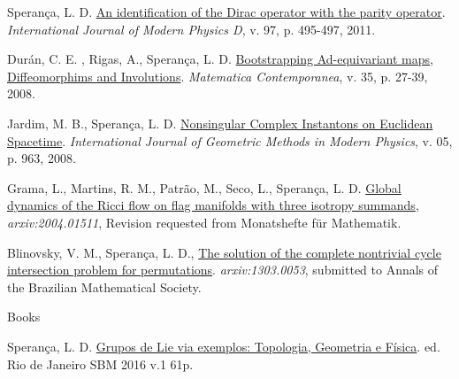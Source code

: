 \documentclass[10pt]{article}
\newenvironment{innerlist}[1][\enskip\textbullet]%
{\begin{compactitem}[#1]}{\end{compactitem}}
\begin{document}
\begin{enumerate}
\begin{innerlist}[-]
		
		
				\item Sperança, L. D. \href{https://www.worldscientific.com/doi/10.1142/S0218271814440039}{An identification of the Dirac operator with the parity operator}. { \textit{International Journal of Modern Physics D},  v. 97, p. 495-497, 2011}.
		    \vspace{.1 in}
		
		
		
	
		
				\item Durán, C. E. , Rigas, A., Sperança, L. D.  \href{https://www.mat.unb.br/~matcont/35_2.pdf}{Bootstrapping Ad-equivariant maps, Diffeomorphims and Involutions}. {\textit{Matematica Contemporanea},  v. 35, p. 27-39, 2008}.
		    \vspace{.1 in}
		
				\item Jardim, M. B., Sperança, L. D. \href{https://www.worldscientific.com/doi/10.1142/S0219887808003132}{Nonsingular Complex Instantons on Euclidean Spacetime}. {\textit{International Journal of Geometric Methods in Modern Physics}, v. 05, p. 963, 2008}.
		
		

\item Grama, L., Martins, R. M., Patrão, M., Seco, L., Sperança, L. D.
\href{https://arxiv.org/abs/2004.01511}{Global dynamics of the Ricci flow on flag manifolds with three isotropy summands}, \textit{{arxiv:2004.01511}}, Revision requested from  Monatshefte f\"ur Mathematik.





\item Blinovsky, V. M., Sperança, L. D., \href{https://arxiv.org/abs/1303.0053}{The solution of the complete nontrivial cycle intersection problem for permutations}. 
\textit{{arxiv:1303.0053}}, submitted to Annals of the Brazilian Mathematical Society.


	\end{innerlist}

		\item {Books}
\begin{innerlist}[-]
\item  Sperança, L. D. \href{https://sbm.org.br/wp-content/uploads/2021/10/grupos-de-lie-via-exemplos_ebook.pdf}{Grupos de Lie via exemplos: Topologia, Geometria e Física}. ed. Rio de Janeiro SBM 2016 v.1 61p.


\end{innerlist}
	
	
\end{enumerate}
	
\end{document}
